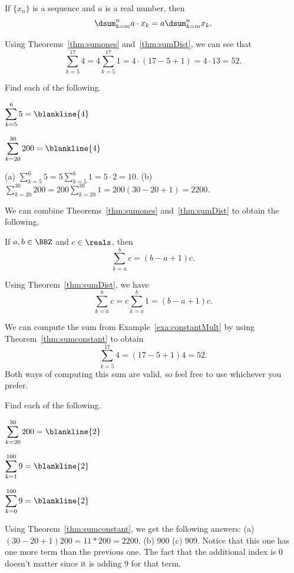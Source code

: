 \begin{thm}\label{thm:sumDist}
If $\{x_n\}$ is a sequence and $a$ is a real number, then 
$$\dsum _{k=m} ^n a\cdot x_k = a\dsum _{k=m} ^n x_k.$$
\end{thm}

\begin{exa}\label{exa:constantMult}
Using Theorems~\ref{thm:sumones} and~\ref{thm:sumDist}, we can see that
$$ \sum_{k=5}^{17} 4 = 4  \sum_{k=5}^{17} 1 = 4\cdot (17-5+1)=4\cdot 13 = 52.$$
\end{exa}

\begin{exer}
Find each of the following.
\begin{lenum}
\item ${\displaystyle \sum_{k=5}^{6} 5 = \blankline{4} }$
\item ${\displaystyle \sum_{k=20}^{30} 200 = \blankline{4} }$
\end{lenum}
\begin{answer}
(a) ${\displaystyle \sum_{k=5}^{6} 5 = 5 \sum_{k=5}^{6} 1= 5\cdot 2 = 10 }$.
(b) ${\displaystyle \sum_{k=20}^{30} 200 = 200\sum_{k=20}^{30} 1=200(30-20+1)=2200}$.
\end{answer}
\end{exer}

We can combine Theorems~\ref{thm:sumones} and~\ref{thm:sumDist} to obtain the following.
\begin{thm}\label{thm:sumconstant}
If $a,b\in\BBZ$ and $c\in\reals$, then 
$$\sum_{k=a}^b c = (b-a+1)c.$$
\begin{pf}
Using Theorem~\ref{thm:sumDist}, we have
$$\sum_{k=a}^b c = c\sum_{k=a}^b 1 = (b-a+1)c.$$
\end{pf}
\end{thm}

\begin{exa}
We can compute the sum from Example~\ref{exa:constantMult} by using Theorem~\ref{thm:sumconstant} to obtain
$$ \sum_{k=5}^{17} 4 = (17-5+1) 4 = 52.$$
Both ways of computing this sum are valid, so feel free to use whichever you prefer.
\end{exa}


\begin{exer}
Find each of the following.
\begin{lenum}
\item ${\displaystyle \sum_{k=20}^{30} 200 = \blankline{2} }$
\item ${\displaystyle \sum_{k=1}^{100} 9 = \blankline{2} }$
\item ${\displaystyle \sum_{k=0}^{100} 9 = \blankline{2} }$
\end{lenum}
\begin{answer}
Using Theorem~\ref{thm:sumconstant}, we get the following answers:
(a) $(30-20+1)200=11*200=2200$.
(b) $900$
(c) $909$. Notice that this one has one more term than the previous one.  
The fact that the additional index is $0$ doesn't matter since it is adding $9$ for that term. 
\end{answer}
\end{exer}

